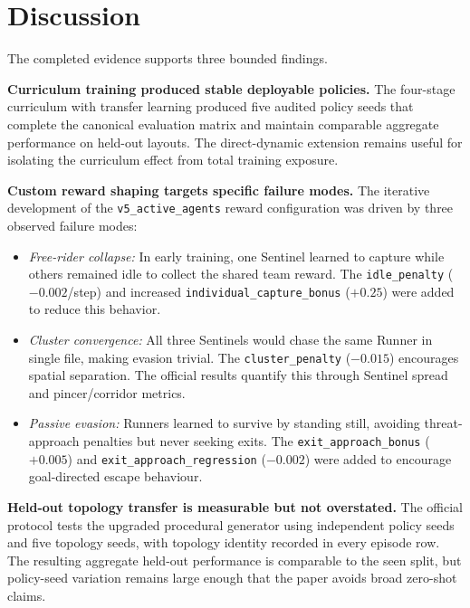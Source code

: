 \documentclass[journal]{IEEEtran}
\begin{document}
\section{Discussion}

The completed evidence supports three bounded findings.

\textbf{Curriculum training produced stable deployable policies.} The four-stage curriculum with transfer learning produced five audited policy seeds that complete the canonical evaluation matrix and maintain comparable aggregate performance on held-out layouts. The direct-dynamic extension remains useful for isolating the curriculum effect from total training exposure.

\textbf{Custom reward shaping targets specific failure modes.} The iterative development of the \texttt{v5\_active\_agents} reward configuration was driven by three observed failure modes:
\begin{itemize}
    \item \textit{Free-rider collapse:} In early training, one Sentinel learned to capture while others remained idle to collect the shared team reward. The \texttt{idle\_penalty} ($-0.002$/step) and increased \texttt{individual\_capture\_bonus} ($+0.25$) were added to reduce this behavior.
    \item \textit{Cluster convergence:} All three Sentinels would chase the same Runner in single file, making evasion trivial. The \texttt{cluster\_penalty} ($-0.015$) encourages spatial separation. The official results quantify this through Sentinel spread and pincer/corridor metrics.
    \item \textit{Passive evasion:} Runners learned to survive by standing still, avoiding threat-approach penalties but never seeking exits. The \texttt{exit\_approach\_bonus} ($+0.005$) and \texttt{exit\_approach\_regression} ($-0.002$) were added to encourage goal-directed escape behaviour.
\end{itemize}

\textbf{Held-out topology transfer is measurable but not overstated.} The official protocol tests the upgraded procedural generator using independent policy seeds and five topology seeds, with topology identity recorded in every episode row. The resulting aggregate held-out performance is comparable to the seen split, but policy-seed variation remains large enough that the paper avoids broad zero-shot claims.
\end{document}
